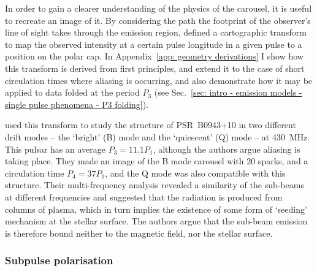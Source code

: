 In order to gain a clearer understanding of the physics of the carousel, it is useful to recreate an image of it. By considering the path the footprint of the observer's line of sight takes through the emission region, \citet{DRxx1999} defined a cartographic transform to map the observed intensity at a certain pulse longitude in a given pulse to a position on the polar cap. In Appendix~\ref{app: geometry derivations} I show how this transform is derived from first principles, and extend it to the case of short circulation times where aliasing is occurring, and also demonstrate how it may be applied to data folded at the period $P_3$ (see Sec.~\ref{sec: intro - emission models - single pulse phenomena - P3 folding}). 

\citet{DRxx2001} used this transform to study the structure of PSR~B0943+10 in two different drift modes -- the `bright' (B) mode and the `quiescent' (Q) mode -- at 430~MHz. This pulsar has an average $P_3 = 11.1 P_1$, although the authors argue aliasing is taking place. They made an image of the B mode carousel with 20 sparks, and a circulation time $P_4 = 37 P_1$, and the Q mode was also compatible with this structure. Their multi-frequency analysis revealed a similarity of the sub-beams at different frequencies and suggested that the radiation is produced from columns of plasma, which in turn implies the existence of some form of `seeding' mechanism at the stellar surface. The authors argue that the sub-beam emission is therefore bound neither to the magnetic field, nor the stellar surface.

\subsubsection{Subpulse polarisation}
\label{sec: intro - emission models - single pulse phenomena - subpulse polarisation}

